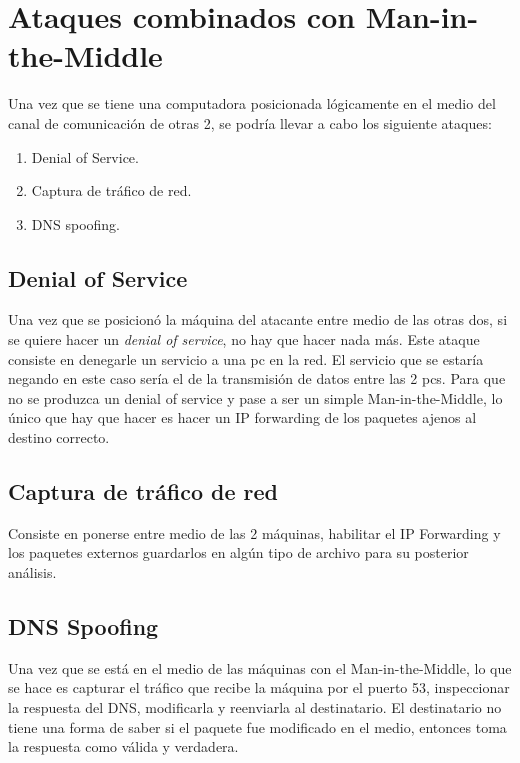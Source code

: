 \documentclass[a4paper, 13pt]{article}
\begin{document}
	\section{Ataques combinados con Man-in-the-Middle}
	\par Una vez que se tiene una computadora posicionada lógicamente en el medio del canal de comunicación de otras 2, se podría llevar a cabo los siguiente ataques:
	\begin{enumerate}
		\item Denial of Service.
		\item Captura de tráfico de red.
		\item DNS spoofing.
	\end{enumerate}
	
	\subsection{Denial of Service}
	\par Una vez que se posicionó la máquina del atacante entre medio de las otras dos, si se quiere hacer un \textit{denial of service}, no hay que hacer nada más. Este ataque consiste en denegarle un servicio a una pc en la red. El servicio que se estaría negando en este caso sería el de la transmisión de datos entre las 2 pcs. Para que no se produzca un denial of service y pase a ser un simple Man-in-the-Middle, lo único que hay que hacer es hacer un IP forwarding de los paquetes ajenos al destino correcto.
	
	\subsection{Captura de tráfico de red}
	\par Consiste en ponerse entre medio de las 2 máquinas, habilitar el IP Forwarding y los paquetes externos guardarlos en algún tipo de archivo para su posterior análisis.
	
	\subsection{DNS Spoofing}
	\par Una vez que se está en el medio de las máquinas con el Man-in-the-Middle, lo que se hace es capturar el tráfico que recibe la máquina por el puerto 53, inspeccionar la respuesta del DNS, modificarla y reenviarla al destinatario. El destinatario no tiene una forma de saber si el paquete fue modificado en el medio, entonces toma la respuesta como válida y verdadera.
	
\end{document}
